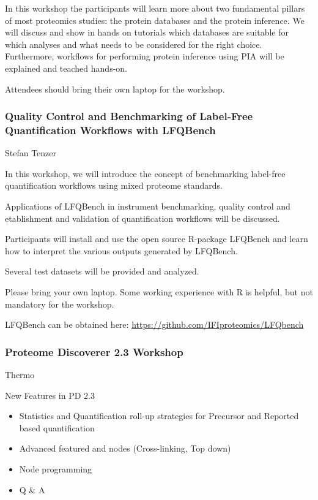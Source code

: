 In this workshop the participants will learn more about two fundamental pillars
of most proteomics studies: the protein databases and the protein inference. We
will discuss and show in hands on tutorials which databases are suitable for
which analyses and what needs to be considered for the right choice.
Furthermore, workflows for performing protein inference using PIA will be
explained and teached hands-on.

Attendees should bring their own laptop for the workshop.

\subsubsection*{\color{eubicRed} Quality Control and Benchmarking of Label-Free Quantification Workflows with LFQBench}
{\color{eubicGray}Stefan Tenzer}

In this workshop, we will introduce the concept of benchmarking label-free quantification workflows using mixed proteome standards.

Applications of LFQBench in instrument benchmarking, quality control and etablishment and validation of quantification workflows will be discussed.

Participants will install and use the open source R-package LFQBench and learn how to interpret the various outputs generated by LFQBench.

Several test datasets will be provided and analyzed.

Please bring your own laptop. Some working experience with R is helpful, but not mandatory for the workshop.

LFQBench can be obtained here: \url{https://github.com/IFIproteomics/LFQbench}


\subsubsection*{\color{eubicRed} Proteome Discoverer 2.3 Workshop}
{\color{eubicGray}Thermo}

New Features in PD 2.3
\begin{itemize}
  \item Statistics and Quantification roll-up strategies for Precursor and Reported based quantification
  \item Advanced featured and nodes (Cross-linking, Top down)
  \item Node programming
  \item Q \& A
\end{itemize}

